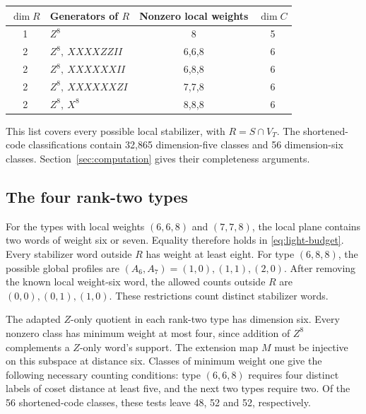 \begin{center}
\begin{tabular}{@{}clcc@{}}\toprule
\(\dim R\)&Generators of \(R\)&Nonzero local weights&\(\dim C\)\\\midrule
1&\(Z^8\)&8&5\\
2&\(Z^8,\ XXXXZZII\)&6,6,8&6\\
2&\(Z^8,\ XXXXXXII\)&6,8,8&6\\
2&\(Z^8,\ XXXXXXZI\)&7,7,8&6\\
2&\(Z^8,\ X^8\)&8,8,8&6\\\bottomrule
\end{tabular}
\end{center}

This list covers every possible local stabilizer, with \(R=S\cap V_T\). The shortened-code
classifications contain 32,865 dimension-five classes and 56
dimension-six classes. Section~\ref{sec:computation} gives their completeness arguments.

\subsection{The four rank-two types}

For the types with local weights \((6,6,8)\) and \((7,7,8)\), the local
plane contains two words of weight six or seven. Equality therefore
holds in \eqref{eq:light-budget}.
Every stabilizer word outside \(R\) has weight at least eight.
For type \((6,8,8)\), the possible global profiles are
\((A_6,A_7)=(1,0),(1,1),(2,0)\).
After removing the known local weight-six word, the allowed counts outside \(R\) are \((0,0),(0,1),(1,0)\).
These restrictions count distinct stabilizer words.

The adapted \(Z\)-only quotient in each rank-two type has dimension six.
Every nonzero class has minimum weight at most four, since addition of \(Z^8\)
complements a \(Z\)-only word's support. The extension map \(M\) must be
injective on this subspace at distance six. Classes of minimum weight one give the following necessary counting
conditions: type \((6,6,8)\) requires four distinct labels of coset distance
at least five, and the next two types require two. Of the 56 shortened-code
classes, these tests leave 48, 52 and 52, respectively.


